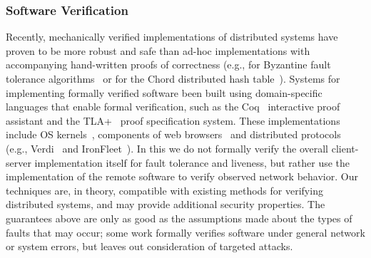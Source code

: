 \subsubsection{Software Verification}
Recently, mechanically verified implementations of distributed
systems have proven to be more robust and safe than ad-hoc
implementations with accompanying hand-written proofs of correctness
(e.g., for Byzantine fault tolerance algorithms~\cite{lamport11:paxos}
or for the Chord distributed hash table~\cite{zave12:chord}). Systems
for implementing formally verified software been built
using domain-specific languages that enable formal verification, such
as the Coq~\cite{bertot13:coq} interactive proof assistant and the
TLA+~\cite{lamport02:tla} proof specification system. These
implementations include OS kernels~\cite{gu15:dsc}, components of web
browsers~\cite{ricketts14:afp} and distributed
protocols (e.g., Verdi~\cite{wilcox15:verdi} and
IronFleet~\cite{hawblitzel15:ironfleet}). In this \dissertation  we do
not formally verify the overall client-server implementation itself
for fault tolerance and liveness, but rather use the implementation of
the remote software to verify observed network behavior. Our
techniques are, in theory, compatible with existing methods for
verifying distributed systems, and may provide additional security
properties. The guarantees above are only as good as the assumptions made
about the types of faults that may occur; some work formally verifies
software under general network or system errors, but leaves out
consideration of targeted attacks.

